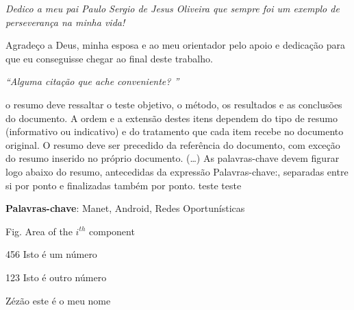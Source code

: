 \documentclass[12pt, %
openright, 
oneside, %
a4paper,    %
brazil]{facom-ufu-abntex2}
\begin{document}
\begin{dedicatoria}
   \vspace*{\fill}
   \centering
   \noindent
   \textit{Dedico a meu pai Paulo Sergio de Jesus Oliveira que sempre foi um exemplo de perseverança na minha vida!}  %
   \vspace*{\fill}
\end{dedicatoria}

\begin{agradecimentos}
Agradeço a Deus, minha esposa e ao meu orientador pelo apoio e dedicação para que eu conseguisse chegar ao final deste trabalho. %
\end{agradecimentos}

\begin{epigrafe}
    \vspace*{\fill}
	\begin{flushright}
		\textit{``Alguma citação que ache conveniente? \lipsum[10]''} %
	\end{flushright}
\end{epigrafe}



\begin{resumo} %
 o resumo deve ressaltar o teste
 objetivo, o método, os resultados e as conclusões do documento. A ordem e a extensão
 destes itens dependem do tipo de resumo (informativo ou indicativo) e do
 tratamento que cada item recebe no documento original. O resumo deve ser
 precedido da referência do documento, com exceção do resumo inserido no
 próprio documento. (\ldots) As palavras-chave devem figurar logo abaixo do
 resumo, antecedidas da expressão Palavras-chave:, separadas entre si por
 ponto e finalizadas também por ponto. teste teste

 \vspace{\onelineskip}
    
 \noindent
 \textbf{Palavras-chave}: Manet, Android, Redes Oportunísticas%
\end{resumo}

\listoffigures*
\cleardoublepage

\listoftables*
\cleardoublepage



\begin{siglas} %
  \item[Fig.] Area of the $i^{th}$ component
  \item[456] Isto é um número
  \item[123] Isto é outro número
  \item[Zézão] este é o meu nome
\end{siglas}
\end{document}
